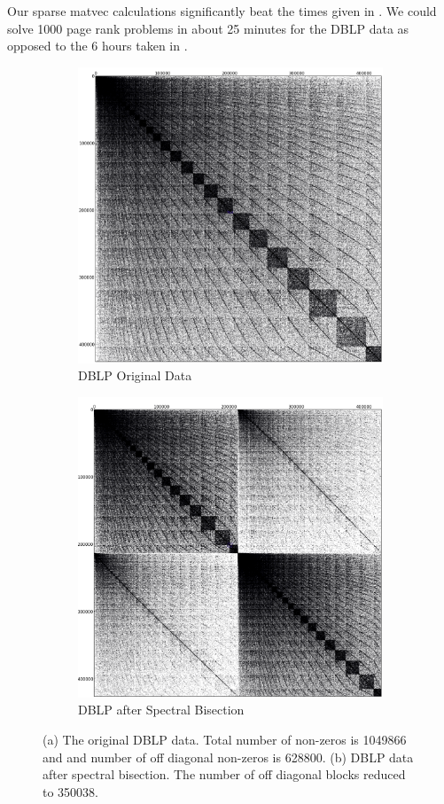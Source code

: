 \documentclass[11pt]{article}
\begin{document}
Our sparse matvec calculations significantly beat the times given in \cite{xie}.
We could solve 1000 page rank
problems in about 25 minutes for the DBLP data as opposed to the 6 hours taken
in \cite{xie}. 


\begin{figure}
\centering
\begin{subfigure}{.5\textwidth}
	\centering
	\includegraphics[width=.9\linewidth]{figs/DBLP_Original.png}
	\caption{DBLP Original Data}
	\label{fig:DBLP}
\end{subfigure}%
\begin{subfigure}{.5\textwidth}
		\centering
		\includegraphics[width=.9\linewidth]{figs/DBLP_SBC0.png}
		\caption{DBLP after Spectral Bisection}
		\label{fig:DBLP_SB_C0}
	\end{subfigure}
	\caption{ (a) The original DBLP data. Total number of
non-zeros is 1049866 and and number of off diagonal non-zeros is 628800. (b)
DBLP data after spectral bisection. The number of off diagonal blocks
reduced to 350038. } 
	\label{fig:DBLPSB}
\end{figure}
\end{document}
